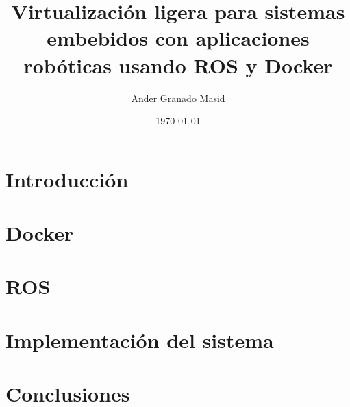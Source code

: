 \documentclass[a4paper,12pt,oneside]{scrbook}
\title{Virtualización ligera para sistemas embebidos con aplicaciones robóticas usando ROS y Docker}
\author{Ander Granado Masid}
\date{\today}
\begin{document}
\frontmatter %

\tableofcontents %
\listoffigures %


\mainmatter %
\part{Introducción}
	
	

\part{Docker}
	
	

\part{ROS}
	
	
	
\part{Implementación del sistema}
	

\part{Conclusiones}
	


\backmatter



\end{document}
